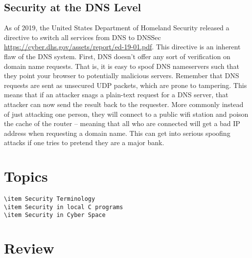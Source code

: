 \subsection{Security at the DNS Level}

As of 2019, the United States Department of Homeland Security released a directive to switch all services from DNS to DNSSec \url{https://cyber.dhs.gov/assets/report/ed-19-01.pdf}.
This directive is an inherent flaw of the DNS system.
First, DNS doesn't offer any sort of verification on domain name requests.
That is, it is easy to spoof DNS nameservers such that they point your browser to potentially malicious servers.
Remember that DNS requests are sent as unsecured UDP packets, which are prone to tampering. This means that if an attacker snags a plain-text request for a DNS server, that attacker can now send the result back to the requester.
More commonly instead of just attacking one person, they will connect to a public wifi station and poison the cache of the router -- meaning that all who are connected will get a bad IP address when requesting a domain name.
This can get into serious spoofing attacks if one tries to pretend they are a major bank.

\section{Topics}

\begin{lstlisting}
\item Security Terminology
\item Security in local C programs
\item Security in Cyber Space
\end{lstlisting}

\section{Review}

